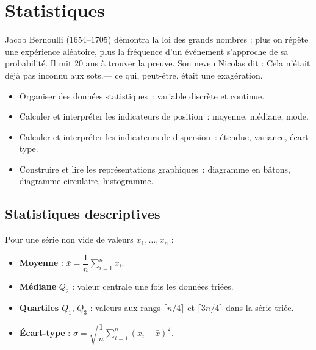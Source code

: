 \chapter{Statistiques}


\begin{anecdote}
Jacob Bernoulli ($1654$--$1705$) d\'emontra la loi des grands nombres :
plus on r\'ep\`ete une exp\'erience al\'eatoire, plus la fr\'equence d'un
\'ev\'enement s'approche de sa probabilit\'e. Il mit $20$ ans \`a trouver la
preuve. Son neveu Nicolas dit : \og Cela n'\'etait d\'ej\`a pas inconnu aux
sots.\fg --- ce qui, peut-\^{e}tre, \'etait une exag\'eration.
\end{anecdote}

\begin{objectifs}
\begin{itemize}
  \item Organiser des donn\'ees statistiques~: variable discr\`ete et continue.
  \item Calculer et interpr\'eter les indicateurs de position~:
        moyenne, m\'ediane, mode.
  \item Calculer et interpr\'eter les indicateurs de dispersion~:
        \'etendue, variance, \'ecart-type.
  \item Construire et lire les repr\'esentations graphiques~:
        diagramme en b\^atons, diagramme circulaire, histogramme.
\end{itemize}
\end{objectifs}

\section{Statistiques descriptives}

\begin{defn}
Pour une s\'erie non vide de valeurs $x_1,\ldots,x_n$ :
\begin{itemize}
  \item \textbf{Moyenne} : $\bar{x} = \dfrac{1}{n}\displaystyle\sum_{i=1}^n x_i$.
  \item \textbf{M\'ediane} $Q_2$ : valeur centrale une fois les donn\'ees tri\'ees.
  \item \textbf{Quartiles} $Q_1$, $Q_3$ \ExtensionTTen : valeurs aux rangs $\lceil n/4\rceil$ et $\lceil3n/4\rceil$ dans la s\'erie tri\'ee.
  \item \textbf{\'Ecart-type} :
        $\sigma = \sqrt{\dfrac{1}{n}\displaystyle\sum_{i=1}^n (x_i - \bar{x})^2}$.
\end{itemize}
\end{defn}


